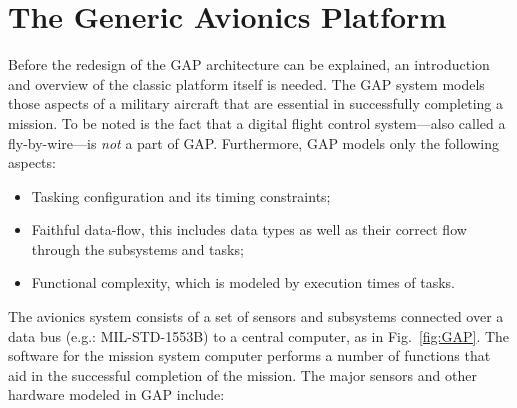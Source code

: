 \section{The Generic Avionics Platform}
\label{GAP}
Before the redesign of the GAP architecture can be explained, an
introduction and overview of the classic platform itself is
needed. The GAP system models those aspects of a military aircraft
that are essential in successfully completing a mission. To be noted
is the fact that a digital flight control system---also called a
fly-by-wire---is \emph{not} a part of GAP. Furthermore, GAP models
only the following aspects:

\begin{itemize}
\item{Tasking configuration and its timing constraints;}
\item{Faithful data-flow, this includes data types as well as their
  correct flow through the subsystems and tasks;}
\item{Functional complexity, which is modeled by execution times of
  tasks.}
\end{itemize}

The avionics system consists of a set of sensors and subsystems
connected over a data bus (e.g.: MIL-STD-1553B) to a central computer,
as in Fig.~\ref{fig:GAP}. The software for the mission system computer
performs a number of functions that aid in the successful completion
of the mission. The major sensors and other hardware modeled in GAP
include:


